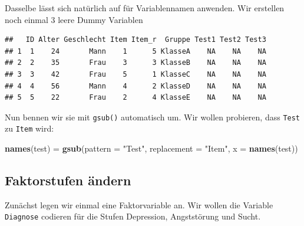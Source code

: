 \documentclass[
]{book}
\newenvironment{Shaded}{\begin{snugshade}}{\end{snugshade}}
\newcommand{\AttributeTok}[1]{\textcolor[rgb]{0.13,0.29,0.53}{#1}}
\newcommand{\ConstantTok}[1]{\textcolor[rgb]{0.56,0.35,0.01}{#1}}
\newcommand{\FunctionTok}[1]{\textcolor[rgb]{0.13,0.29,0.53}{\textbf{#1}}}
\newcommand{\NormalTok}[1]{#1}
\newcommand{\OtherTok}[1]{\textcolor[rgb]{0.56,0.35,0.01}{#1}}
\newcommand{\SpecialCharTok}[1]{\textcolor[rgb]{0.81,0.36,0.00}{\textbf{#1}}}
\newcommand{\StringTok}[1]{\textcolor[rgb]{0.31,0.60,0.02}{#1}}
\begin{document}
Dasselbe lässt sich natürlich auf für Variablennamen anwenden. Wir erstellen noch einmal 3 leere Dummy Variablen

\begin{Shaded}
\end{Shaded}

\begin{verbatim}
##   ID Alter Geschlecht Item Item_r  Gruppe Test1 Test2 Test3
## 1  1    24       Mann    1      5 KlasseA    NA    NA    NA
## 2  2    35       Frau    3      3 KlasseB    NA    NA    NA
## 3  3    42       Frau    5      1 KlasseC    NA    NA    NA
## 4  4    56       Mann    4      2 KlasseD    NA    NA    NA
## 5  5    22       Frau    2      4 KlasseE    NA    NA    NA
\end{verbatim}

Nun bennen wir sie mit \texttt{gsub()} automatisch um. Wir wollen probieren, dass \texttt{Test} zu \texttt{Item} wird:

\begin{Shaded}
\begin{Highlighting}[]
\FunctionTok{names}\NormalTok{(test) }\OtherTok{=} \FunctionTok{gsub}\NormalTok{(}\AttributeTok{pattern =} \StringTok{"Test"}\NormalTok{, }\AttributeTok{replacement =} \StringTok{"Item"}\NormalTok{, }\AttributeTok{x =} \FunctionTok{names}\NormalTok{(test))}
\end{Highlighting}
\end{Shaded}

\subsection{Faktorstufen ändern}\label{faktorstufen-uxe4ndern}

Zunächst legen wir einmal eine Faktorvariable an. Wir wollen die Variable \texttt{Diagnose} codieren für die Stufen Depression, Angststörung und Sucht.

\begin{Shaded}
\end{Shaded}
\end{document}
